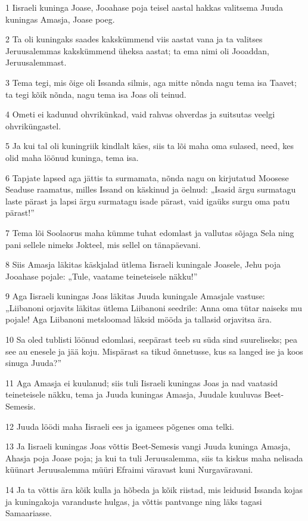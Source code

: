 \par 1 Iisraeli kuninga Joase, Jooahase poja teisel aastal hakkas valitsema Juuda kuningas Amasja, Joase poeg.
\par 2 Ta oli kuningaks saades kakskümmend viis aastat vana ja ta valitses Jeruusalemmas kakskümmend üheksa aastat; ta ema nimi oli Jooaddan, Jeruusalemmast.
\par 3 Tema tegi, mis õige oli Issanda silmis, aga mitte nõnda nagu tema isa Taavet; ta tegi kõik nõnda, nagu tema isa Joas oli teinud.
\par 4 Ometi ei kadunud ohvrikünkad, vaid rahvas ohverdas ja suitsutas veelgi ohvriküngastel.
\par 5 Ja kui tal oli kuningriik kindlalt käes, siis ta lõi maha oma sulased, need, kes olid maha löönud kuninga, tema isa.
\par 6 Tapjate lapsed aga jättis ta surmamata, nõnda nagu on kirjutatud Moosese Seaduse raamatus, milles Issand on käskinud ja öelnud: „Isasid ärgu surmatagu laste pärast ja lapsi ärgu surmatagu isade pärast, vaid igaüks surgu oma patu pärast!”
\par 7 Tema lõi Soolaorus maha kümme tuhat edomlast ja vallutas sõjaga Sela ning pani sellele nimeks Jokteel, mis sellel on tänapäevani.
\par 8 Siis Amasja läkitas käskjalad ütlema Iisraeli kuningale Joasele, Jehu poja Jooahase pojale: „Tule, vaatame teineteisele näkku!”
\par 9 Aga Iisraeli kuningas Joas läkitas Juuda kuningale Amasjale vastuse: „Liibanoni orjavits läkitas ütlema Liibanoni seedrile: Anna oma tütar naiseks mu pojale! Aga Liibanoni metsloomad läksid mööda ja tallasid orjavitsa ära.
\par 10 Sa oled tublisti löönud edomlasi, seepärast teeb su süda sind suureliseks; pea see au enesele ja jää koju. Mispärast sa tikud õnnetusse, kus sa langed ise ja koos sinuga Juuda?”
\par 11 Aga Amasja ei kuulanud; siis tuli Iisraeli kuningas Joas ja nad vaatasid teineteisele näkku, tema ja Juuda kuningas Amasja, Juudale kuuluvas Beet-Semesis.
\par 12 Juuda löödi maha Iisraeli ees ja igamees põgenes oma telki.
\par 13 Ja Iisraeli kuningas Joas võttis Beet-Semesis vangi Juuda kuninga Amasja, Ahasja poja Joase poja; ja kui ta tuli Jeruusalemma, siis ta kiskus maha nelisada küünart Jeruusalemma müüri Efraimi väravast kuni Nurgaväravani.
\par 14 Ja ta võttis ära kõik kulla ja hõbeda ja kõik riistad, mis leidusid Issanda kojas ja kuningakoja varanduste hulgas, ja võttis pantvange ning läks tagasi Samaariasse.
